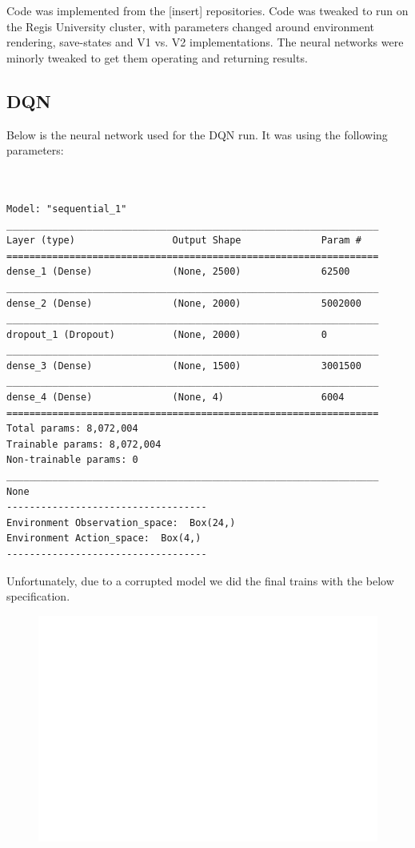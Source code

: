 \documentclass[man, 12pt]{apa6}
\begin{document}
Code was implemented from the [insert] repositories. Code was tweaked to run on the Regis University cluster, with parameters changed around environment rendering, save-states and V1 vs. V2 implementations. The neural networks were minorly tweaked to get them operating and returning results. 

\subsection{DQN}
Below is the neural network used for the DQN run. It was using the following parameters:

\begin{verbatim}


Model: "sequential_1"
_________________________________________________________________
Layer (type)                 Output Shape              Param #   
=================================================================
dense_1 (Dense)              (None, 2500)              62500     
_________________________________________________________________
dense_2 (Dense)              (None, 2000)              5002000   
_________________________________________________________________
dropout_1 (Dropout)          (None, 2000)              0         
_________________________________________________________________
dense_3 (Dense)              (None, 1500)              3001500   
_________________________________________________________________
dense_4 (Dense)              (None, 4)                 6004      
=================================================================
Total params: 8,072,004
Trainable params: 8,072,004
Non-trainable params: 0
_________________________________________________________________
None
-----------------------------------
Environment Observation_space:  Box(24,)
Environment Action_space:  Box(4,)
-----------------------------------
\end{verbatim}

Unfortunately, due to a corrupted model we did the final trains with the below specification. 


\begin{figure}
\includegraphics[]{results/dqn/rewards.png}

\end{figure}
\end{document}
